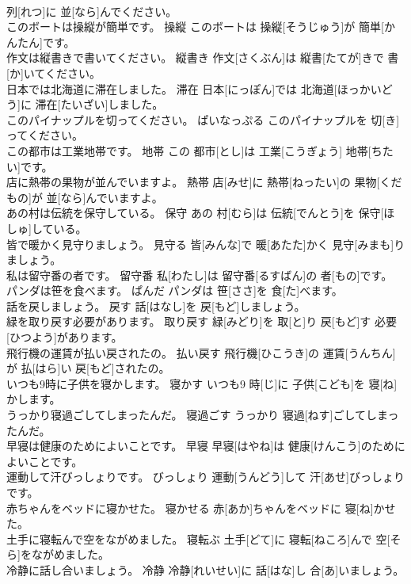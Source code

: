 \documentclass[8pt]{extreport}
\begin{document}
\begin{CJK}{UTF8}{min}
\\	列[れつ]に 並[なら]んでください。	
\\	このボートは操縦が簡単です。	操縦	このボートは 操縦[そうじゅう]が 簡単[かんたん]です。	
\\	作文は縦書きで書いてください。	縦書き	作文[さくぶん]は 縦書[たてが]きで 書[か]いてください。	
\\	日本では北海道に滞在しました。	滞在	日本[にっぽん]では 北海道[ほっかいどう]に 滞在[たいざい]しました。	
\\	このパイナップルを切ってください。	ぱいなっぷる	このパイナップルを 切[き]ってください。	
\\	この都市は工業地帯です。	地帯	この 都市[とし]は 工業[こうぎょう] 地帯[ちたい]です。	
\\	店に熱帯の果物が並んでいますよ。	熱帯	店[みせ]に 熱帯[ねったい]の 果物[くだもの]が 並[なら]んでいますよ。	
\\	あの村は伝統を保守している。	保守	あの 村[むら]は 伝統[でんとう]を 保守[ほしゅ]している。	
\\	皆で暖かく見守りましょう。	見守る	皆[みんな]で 暖[あたた]かく 見守[みまも]りましょう。	
\\	私は留守番の者です。	留守番	私[わたし]は 留守番[るすばん]の 者[もの]です。	
\\	パンダは笹を食べます。	ぱんだ	パンダは 笹[ささ]を 食[た]べます。	
\\	話を戻しましょう。	戻す	話[はなし]を 戻[もど]しましょう。	
\\	緑を取り戻す必要があります。	取り戻す	緑[みどり]を 取[と]り 戻[もど]す 必要[ひつよう]があります。	
\\	飛行機の運賃が払い戻されたの。	払い戻す	飛行機[ひこうき]の 運賃[うんちん]が 払[はら]い 戻[もど]されたの。	
\\	いつも9時に子供を寝かします。	寝かす	いつも9 時[じ]に 子供[こども]を 寝[ね]かします。	
\\	うっかり寝過ごしてしまったんだ。	寝過ごす	うっかり 寝過[ねす]ごしてしまったんだ。	
\\	早寝は健康のためによいことです。	早寝	早寝[はやね]は 健康[けんこう]のためによいことです。	
\\	運動して汗びっしょりです。	びっしょり	運動[うんどう]して 汗[あせ]びっしょりです。	
\\	赤ちゃんをベッドに寝かせた。	寝かせる	赤[あか]ちゃんをベッドに 寝[ね]かせた。	
\\	土手に寝転んで空をながめました。	寝転ぶ	土手[どて]に 寝転[ねころ]んで 空[そら]をながめました。	
\\	冷静に話し合いましょう。	冷静	冷静[れいせい]に 話[はな]し 合[あ]いましょう。	

\end{CJK}
\end{document}
